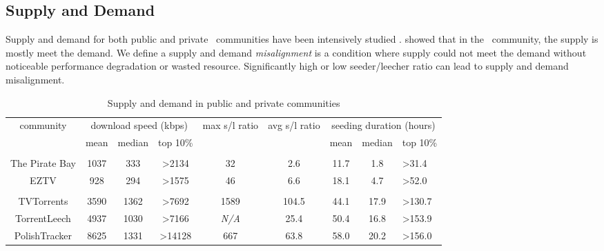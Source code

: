\subsection{Supply and Demand}
\label{section:suppdemand}
Supply and demand for both public and private \bt~communities have been intensively studied \cite{2010:pubpriv:meulpolder, 2009:demandsupplyres:andrade}. \citeauthor{2009:demandsupplyres:andrade} showed that in the \bt~community, the supply is mostly meet the demand. We define a supply and demand \textit{misalignment} is a condition where supply could not meet the demand without noticeable performance degradation or wasted resource. Significantly high or low seeder/leecher ratio can lead to supply and demand misalignment.

\begin{table}[]
	\centering
	\caption{Supply and demand in public and private communities \cite{2010:pubpriv:meulpolder}}
	\label{tbl:supdemand}
	\begin{adjustwidth}{-1.5cm}{}
		\begin{tabular}{|c|c|c|c|c|c|c|c|l|}
			\hline
			\multicolumn{1}{|c|}{\multirow{2}{0.1\linewidth}{community}} &  \multicolumn{3}{c|}{download speed (kbps)} & \multicolumn{1}{c|}{\multirow{2}{0.1\linewidth}{max s/l ratio}} & \multicolumn{1}{c|}{\multirow{2}{0.1\linewidth}{avg s/l ratio}} & \multicolumn{3}{c|}{seeding duration (hours)} \\ \cline{2-4} \cline{7-9} 
			\multicolumn{1}{|c|}{} & {mean} & {median} & {top 10\%} & {} & {} & {mean} & {median} & {top 10\%} \\ \hline
			\multicolumn{8}{l}{} \\ \hline
			The Pirate Bay & {1037} & {333} & {\textgreater2134} & 32 & {2.6} & {11.7} & {1.8} & {\textgreater31.4} \\ \hline
			EZTV  & {928} & {294} & {\textgreater1575} & 46 & {6.6} & {18.1} & {4.7} & {\textgreater52.0} \\ \hline
			\multicolumn{8}{l}{} \\ \hline
			TVTorrents & 3590 & 1362 & \textgreater7692 & 1589 & 104.5 & 44.1 & 17.9 & \textgreater130.7 \\ \hline
			TorrentLeech  & {4937} & {1030} & {\textgreater7166} & \textit{N/A} & {25.4} & {50.4} & {16.8} & {\textgreater153.9} \\ \hline
			PolishTracker  & {8625} & {1331} & {\textgreater14128} & 667 & {63.8} & {58.0} & {20.2} & {\textgreater156.0} \\ \hline
		\end{tabular}
	\end{adjustwidth}
\end{table}

